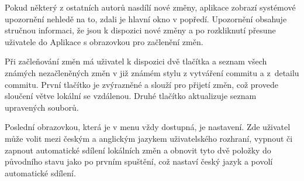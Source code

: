 Pokud některý z ostatních autorů nasdílí nové změny, aplikace zobrazí systémové upozornění nehledě na to, zdali je hlavní okno v popředí. Upozornění obsahuje stručnou informaci, že jsou k dispozici nové změny a po rozkliknutí přesune uživatele do Aplikace s obrazovkou pro začlenění změn.

Při začleňování změn má uživatel k dispozici dvě tlačítka a seznam všech známých nezačleněných změn v již známém stylu z vytváření commitu a z~detailu commitu. První tlačítko je zvýrazněné a slouží pro přijetí změn, což provede sloučení větve lokální se vzdálenou. Druhé tlačítko aktualizuje seznam upravených souborů.

Poslední obrazovkou, která je v menu vždy dostupná, je nastavení. Zde uživatel může volit mezi českým a anglickým jazykem uživatelského rozhraní, vypnout či zapnout automatické sdílení lokálních změn a obnovit tyto dvě položky do původního stavu jako po prvním spuštění, což nastaví český jazyk a povolí automatické sdílení.

